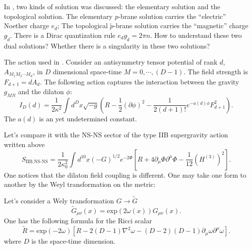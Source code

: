 
\begin{question}
	In ,
	two kinds of solution was discussed:
	the elementary solution and the topological solution.
	The elementary $p$-brane solution carries the ``electric'' Noether charge $e_d$;
	The topological $\tilde{p}$-brane solution carries the ``magnetic'' charge $g_{\tilde{d}}$.
	There is a Dirac quantization rule $e_d g_{\tilde{d}}=2\pi n$.
	How to understand these two dual solutions?
	Whether there is a singularity in these two solutions?
\end{question}

\begin{info}
	The action used in .
	Consider an antisymmetry tensor potential of rank $d$,
	$A_{M_1 M_2 \cdots M_d}$,
	in $D$ dimensional space-time $M=0,\cdots,(D-1)$.
	The field strength is $F_{d+1}=dA_d$.
	The following action captures the interaction between
	the gravity $g_{MN}$
	and the dilaton $\phi$:
	\begin{equation}
		I_{D}(d) = \frac{1}{2\kappa^2} \int d^D x
		\sqrt{-g} \left( R - \frac{1}{2}(\partial \phi)^2
		-\frac{1}{2(d+1)!} e^{-a(d)\phi} F_{d+1}^2\right) .
	\end{equation}
	The $a(d)$ is an yet undetermined constant.
\end{info}

Let's compare it with the 
NS-NS sector of the type IIB supergravity action 
written above 
\[
S_{\text{IIB,NS-NS}} = \frac{1}{2\kappa_0^2}
	\int d^{10} x (-G)^{1 / 2} 	
	e^{-2\Phi} \left[ R + 4 \partial_\mu\Phi \partial^\mu\Phi
		-\frac{1}{12}(H^{(3)})^2\right] 
.\] 
One notices that the dilaton field coupling is different.
One may take one form to another by
the Weyl transformation on the metric:
\begin{info}
	Let's consider a Wely transformation $G\to\tilde{G}$
	\begin{equation}
		\tilde{G}_{\mu\nu} (x) = \mathrm{exp}(2\omega(x)) G_{\mu\nu}(x).
	\end{equation}
	One has the following formula
	for the Ricci scalar
	\begin{equation}
		\tilde{R} = \mathrm{exp}(-2\omega)
		\left[ R - 2(D-1)\nabla^2\omega
		-(D-2)(D-1)\partial_\mu \omega \partial^\mu \omega\right] .
	\end{equation}
	where $D$ is the space-time dimension.
\end{info}


